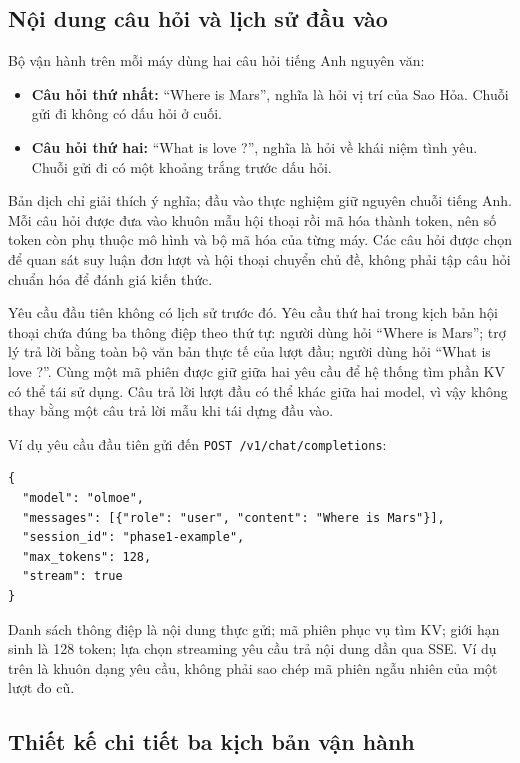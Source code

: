 \subsection{Nội dung câu hỏi và lịch sử đầu vào}

Bộ vận hành trên mỗi máy dùng hai câu hỏi tiếng Anh nguyên văn:

\begin{itemize}
\item \textbf{Câu hỏi thứ nhất:} “Where is Mars”, nghĩa là hỏi vị trí của Sao Hỏa. Chuỗi gửi đi không có dấu hỏi ở cuối.
\item \textbf{Câu hỏi thứ hai:} “What is love ?”, nghĩa là hỏi về khái niệm tình yêu. Chuỗi gửi đi có một khoảng trắng trước dấu hỏi.
\end{itemize}

Bản dịch chỉ giải thích ý nghĩa; đầu vào thực nghiệm giữ nguyên chuỗi tiếng Anh. Mỗi câu hỏi được đưa vào khuôn mẫu hội thoại rồi mã hóa thành token, nên số token còn phụ thuộc mô hình và bộ mã hóa của từng máy. Các câu hỏi được chọn để quan sát suy luận đơn lượt và hội thoại chuyển chủ đề, không phải tập câu hỏi chuẩn hóa để đánh giá kiến thức.

Yêu cầu đầu tiên không có lịch sử trước đó. Yêu cầu thứ hai trong kịch bản hội thoại chứa đúng ba thông điệp theo thứ tự: người dùng hỏi “Where is Mars”; trợ lý trả lời bằng toàn bộ văn bản thực tế của lượt đầu; người dùng hỏi “What is love ?”. Cùng một mã phiên được giữ giữa hai yêu cầu để hệ thống tìm phần KV có thể tái sử dụng. Câu trả lời lượt đầu có thể khác giữa hai model, vì vậy không thay bằng một câu trả lời mẫu khi tái dựng đầu vào.

Ví dụ yêu cầu đầu tiên gửi đến \nolinkurl{POST /v1/chat/completions}:

\begin{lstlisting}
{
  "model": "olmoe",
  "messages": [{"role": "user", "content": "Where is Mars"}],
  "session_id": "phase1-example",
  "max_tokens": 128,
  "stream": true
}
\end{lstlisting}

Danh sách thông điệp là nội dung thực gửi; mã phiên phục vụ tìm KV; giới hạn sinh là 128 token; lựa chọn streaming yêu cầu trả nội dung dần qua SSE. Ví dụ trên là khuôn dạng yêu cầu, không phải sao chép mã phiên ngẫu nhiên của một lượt đo cũ.

\subsection{Thiết kế chi tiết ba kịch bản vận hành}

